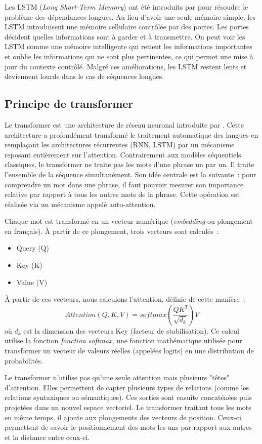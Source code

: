 Les LSTM (\textit{Long Short-Term Memory}) ont été introduits par \citet{hochreiter_1997} pour résoudre le problème des dépendances longues.
Au lieu d’avoir une seule mémoire simple, les LSTM introduisent une mémoire cellulaire contrôlée par des portes.
Les portes décident quelles informations sont à garder et à transmettre.
On peut voir les LSTM comme une mémoire intelligente qui retient les informations importantes et oublie les informations
qui ne sont plus pertinentes, ce qui permet une mise à jour du contexte contrôlé.
Malgré ces améliorations, les LSTM restent lents et deviennent lourds dans le cas de séquences longues.

\subsection{Principe de transformer}

Le transformer est une architecture de réseau neuronal introduite par \citet{vaswani_2017}.
Cette architecture a profondément transformé le traitement automatique des langues en remplaçant
les architectures récurrentes (RNN, LSTM) par un mécanisme reposant entièrement sur l’attention.
Contrairement aux modèles séquentiels classiques, le transformer ne traite pas les mots d’une phrase
un par un. Il traite l’ensemble de la séquence simultanément. Son idée centrale est la suivante~:
pour comprendre un mot dans une phrase, il faut pouvoir mesurer son importance relative par
rapport à tous les autres mots de la phrase. Cette opération est réalisée via un mécanisme appelé auto-attention.

Chaque mot est transformé en un vecteur numérique (\textit{embedding} ou plongement en français).
À partir de ce plongement, trois vecteurs sont calculés~:
\begin{itemize}
    \item Query (Q)
    \item Key (K)
    \item Value (V)
\end{itemize}
À partir de ces vecteurs, nous calculons l'attention, définie de cette manière~:
\[ Attention(Q,K,V)=softmax(\frac{QK^{T}}{\sqrt{d_{k}}})V \]
où \( d_{k} \) est la dimension des vecteurs Key (facteur de stabilisation).
Ce calcul utilise la fonction \textit{\gls{fonction softmax}}, une fonction
mathématique utilisée pour transformer un vecteur de valeurs réelles (appelées logits)
en une distribution de probabilités.

Le transformer n'utilise pas qu'une seule attention mais plusieurs "têtes" d'attention. Elles
permettent de capter plusieurs types de relations (comme les relations syntaxiques ou sémantiques).
Ces sorties sont ensuite concaténées puis projetées dans un nouvel espace vectoriel.
Le transformer traitant tous les mots en même temps, il ajoute aux plongements des vecteurs
de position. Ceux-ci permettent de savoir le positionnement des mots les uns par rapport aux autres
et la distance entre ceux-ci.

